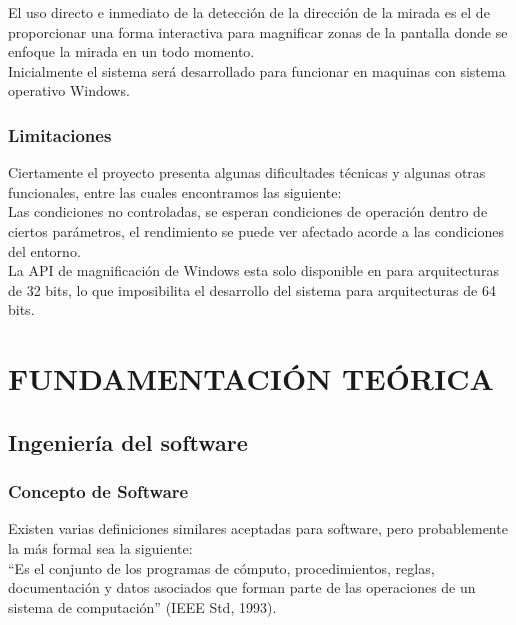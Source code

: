 \documentclass[12pt]{book} %
\begin{document}
		El uso directo e inmediato de la detección de la dirección de la mirada es el de proporcionar una forma interactiva 
		para magnificar zonas de la pantalla donde se enfoque la mirada en un todo momento.\\
		
		Inicialmente el sistema será desarrollado para funcionar en maquinas con sistema operativo Windows.\\
		
	\subsection{Limitaciones}
		Ciertamente el proyecto presenta algunas dificultades técnicas y algunas otras funcionales, entre las cuales encontramos
		las siguiente:\\
		
		Las condiciones no controladas, se esperan condiciones de operación dentro de ciertos parámetros, el rendimiento se puede 
		ver afectado acorde a las condiciones del entorno.\\
		
		La API de magnificación de Windows esta solo disponible en para arquitecturas de 32 bits, lo que imposibilita el desarrollo
		del sistema para arquitecturas de 64 bits.\\
	
		
		 

\chapter{FUNDAMENTACIÓN TEÓRICA}
\thispagestyle{empty}
\newpage
\section{Ingeniería del software}
	\subsection{Concepto de Software}
		Existen varias definiciones similares aceptadas para software, pero probablemente la más formal sea la siguiente:\\
		
		“Es el conjunto de los programas de cómputo, procedimientos, reglas, documentación y datos asociados que forman parte de las
		operaciones de un sistema de computación” (IEEE Std, 1993).\\
		
\end{document}
